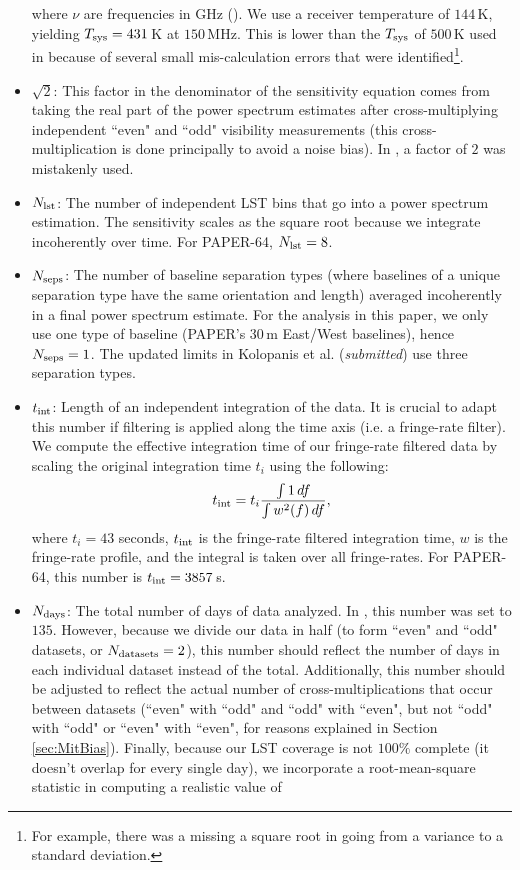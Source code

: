 \documentclass[preprint2,numberedappendix,tighten]{aastex6}
\begin{document}
\begin{itemize}
where $\nu$ are frequencies in GHz (\citealt{thompson_et_al2001}). We use a receiver temperature of $144$\,K, yielding $T_{\rm sys} = 431$\,K at $150$\,MHz. 
This is lower than the $T_{\rm sys}$ of $500$\,K used in  because of several small mis-calculation errors that were 
identified\footnote{For example, there was a missing a square root in going from a variance to a standard deviation.}.
\item $\sqrt{2}$: This factor in the denominator of the sensitivity equation comes from taking the real part of the power spectrum 
estimates after cross-multiplying independent ``even" and ``odd" visibility measurements (this cross-multiplication is done principally to avoid a noise bias). In , a factor of $2$ was mistakenly used.
\item $N_{\rm lst}$: The number of independent LST bins that go into a power spectrum estimation. The sensitivity scales as the square root 
because we integrate incoherently over time. For PAPER-64, $N_{\rm lst} = 8$.
\item $N_{\rm seps}$: The number of baseline separation types (where baselines of a unique separation type have the same orientation and length) averaged incoherently in a final power spectrum estimate. For the 
analysis in this paper, we only use one type of baseline (PAPER's 30\,m East/West baselines), hence $N_{\rm seps}=1$. The updated limits in Kolopanis et al. (\textit{submitted})
use three separation types.
\item $t_{\rm int}$: Length of an independent integration of the data. It is crucial to adapt this number if filtering is applied along the time axis (i.e. a 
fringe-rate filter). We compute the effective integration time of our fringe-rate filtered data by scaling the original integration time $t_{i}$
using the following:
\begin{equation}
t_{\rm int} = t_{i} \frac{\int1 \, df}{\int w^{2}(f) \,df},
\end{equation}
where $t_{i}=43$ seconds, $t_{\rm int}$ is the fringe-rate filtered integration time, $w$ is the fringe-rate profile, and the integral is 
taken over all fringe-rates. For PAPER-64, this number is $t_{\rm int} = 3857$\,s. 
\item $N_{\rm days}$: The total number of days of data analyzed. In , this number was set to $135$. However, because we 
divide our data in half (to form ``even" and ``odd" datasets, or $N_{\rm datasets} = 2$), this number should reflect the number of days in each individual dataset instead of the total. Additionally, this number should be adjusted to reflect the actual number of cross-multiplications that occur between datasets (``even" with ``odd" and ``odd" with ``even", but not ``odd" with ``odd" or ``even" with ``even", for reasons explained in Section \ref{sec:MitBias}). Finally, because our LST coverage is not $100\%$ complete (it doesn't overlap for every single day), we incorporate a root-mean-square statistic in computing a realistic value of 

\end{itemize}
\end{document}

